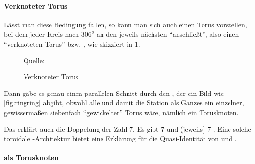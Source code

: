 \paragraph{Verknoteter Torus}
Lässt man diese Bedingung fallen, so kann man sich auch einen Torus vorstellen, bei dem jeder Kreis nach $306^o$ an den jeweils nächsten "`anschließt"', also einen "`verknoteten Torus"' bzw. , wie skizziert in \cref{fig:knottedtorus}.

\begin{figure}
    \centering
    \caption{Verknoteter Torus}
    Quelle:  \cite{knottedtorus}
    \label{fig:knottedtorus}
\end{figure}

Dann gäbe es genau einen parallelen Schnitt durch den , der ein Bild wie \cref{fig:ringring} abgibt, obwohl alle  und damit die Station als Ganzes ein einzelner, gewissermaßen siebenfach "`gewickelter"' Torus wäre, nämlich ein Torusknoten.

Das erklärt auch die Doppelung der Zahl $7$. Es gibt $7$  und (jeweils) $7$ . Eine solche toroidale -Architektur bietet eine Erklärung für die Quasi-Identität von  und .

\paragraph{ als Torusknoten}

